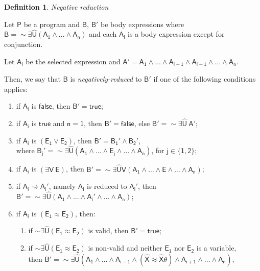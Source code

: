 \documentclass[inscr,ack,preface]{dithesis}
\theoremstyle{definition}
\newtheorem{definition}{Definition}[]
\newcommand{\msf}[1]{$\mathsf{#1}$}
\begin{document}
\begin{definition}{\emph{Negative reduction}}
\label{def:negreduction}

Let \msf{P} be a program and \msf{B}, \msf{B'} be body expressions where \msf{B = \sim \exists \widehat{U} \left( A_1 \land \dots \land A_n \right)} and each \msf{A_i} is a body expression except for conjunction.

Let \msf{A_i} be the selected expression and \msf{A' = A_1 \land \dots \land A_{i-1} \land A_{i+1} \land \dots \land A_n}.

Then, we say that \msf{B} is \emph{negatively-reduced} to \msf{B'} if one of the following conditions applies:

\begin{enumerate}
  \item if \msf{A_i} is \msf{false}, then \msf{B' = true};
  \item if \msf{A_i} is \msf{true} and \msf{n = 1}, then \msf{B' = false},
        else \msf{B' = \sim \exists \widehat{U} ~ A'};
  \item if \msf{A_i} is \msf{\left( E_1 \lor E_2 \right)},
        then \msf{B' = B_1' \land B_2'}, \\ where \msf{B_j' = \sim \exists \widehat{U} \left( A_1 \land \dots \land E_j \land \dots \land A_n \right)}, for \msf{j \in \{ 1, 2 \}};
  \item if \msf{A_i} is \msf{\left( \exists V ~ E \right)},
        then \msf{B' = \sim \exists \widehat{U} V \left( A_1 \land \dots \land E \land \dots \land A_n \right)};
  \item if \msf{A_i \rightsquigarrow A_i'}, namely \msf{A_i} is reduced to \msf{A_i'},
        then \msf{B' = \sim \exists \widehat{U} \left( A_1 \land \dots \land A_i' \land \dots \land A_n \right)};
  \item if \msf{A_i} is \msf{\left( E_1 \approx E_2 \right)}, then:
        \begin{enumerate}
          \item if \msf{\sim \exists \widehat{U} \left( E_1 \approx E_2 \right)}
                is valid, then \msf{B' = true};
          \item if \msf{\sim \exists \widehat{U} \left( E_1 \approx E_2 \right)}
                is non-valid and neither \msf{E_1} nor \msf{E_2} is a variable,
                \\then \msf{B' = \sim \exists \widehat{U} \left( A_1 \land \dots \land A_{i-1} \land \left( \widehat{X} \approx \widehat{X} \theta \right) \land A_{i+1} \land \dots \land A_n \right)},

\end{enumerate}
\end{enumerate}
\end{definition}
\end{document}
